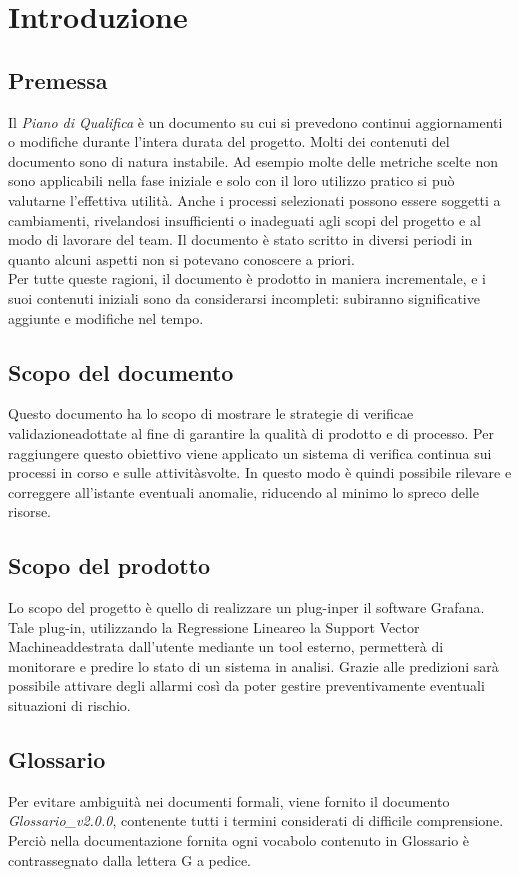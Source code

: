 \section{Introduzione}
\subsection{Premessa}
Il \textit{Piano di Qualifica} è un documento su cui si prevedono continui aggiornamenti o modifiche durante l'intera durata del progetto. Molti dei contenuti del documento sono di natura instabile. Ad esempio molte delle metriche scelte non sono applicabili nella fase iniziale e solo con il loro utilizzo pratico si può valutarne l'effettiva utilità. Anche i processi selezionati possono essere soggetti a cambiamenti, rivelandosi insufficienti o inadeguati agli scopi del progetto e al modo di lavorare del team. Il documento è stato scritto in diversi periodi in quanto alcuni aspetti non si potevano conoscere a priori. \\
Per tutte queste ragioni, il documento è prodotto in maniera incrementale\glo, e i suoi contenuti iniziali sono da considerarsi incompleti: subiranno significative aggiunte e modifiche nel tempo.

\subsection{Scopo del documento}
Questo documento ha lo scopo di mostrare le strategie di verifica\glo e validazione\glo adottate al fine di garantire la qualità di prodotto e di processo\glo. Per raggiungere questo obiettivo viene applicato un sistema di verifica continua sui processi in corso e sulle attività\glo svolte. In questo modo è quindi possibile rilevare e correggere all'istante eventuali anomalie, riducendo al minimo lo spreco delle risorse.

\subsection{Scopo del prodotto}
Lo scopo del progetto è quello di realizzare un plug-in\glo per il software Grafana\glo. Tale plug-in, utilizzando la Regressione Lineare\glo o la Support Vector Machine\glo addestrata dall'utente mediante un tool esterno, permetterà di monitorare e predire lo stato di un sistema in analisi. Grazie alle predizioni sarà possibile attivare degli allarmi così da poter gestire preventivamente eventuali situazioni di rischio. 

\subsection{Glossario}
Per evitare ambiguità nei documenti formali, viene fornito il documento \textit{Glossario\_v2.0.0},
contenente tutti i termini considerati di difficile comprensione. Perciò nella documentazione fornita ogni vocabolo contenuto in Glossario è contrassegnato dalla lettera G a pedice.

